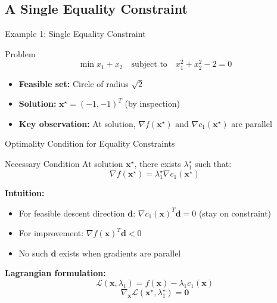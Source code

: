\documentclass[aspectratio=1610]{beamer}
\begin{document}
\subsection{A Single Equality Constraint}
\begin{frame}{Example 1: Single Equality Constraint}
  \begin{block}{Problem}
    $$\min x_1 + x_2 \quad \text{subject to} \quad x_1^2 + x_2^2 - 2 = 0$$
  \end{block}
  
  \begin{itemize}
    \item \textbf{Feasible set:} Circle of radius $\sqrt{2}$
    \item \textbf{Solution:} $\mathbf{x}^{\star} = (-1, -1)^T$ (by inspection)
    \item \textbf{Key observation:} At solution, $\nabla f(\mathbf{x}^{\star})$ and $\nabla c_1(\mathbf{x}^{\star})$ are parallel
  \end{itemize}
  
  \vspace{0.3cm}
\end{frame}

\begin{frame}{Optimality Condition for Equality Constraints}
  \begin{block}{Necessary Condition}
    At solution $\mathbf{x}^{\star}$, there exists $\lambda_1^{\star}$ such that:
    $$\nabla f(\mathbf{x}^{\star}) = \lambda_1^{\star} \nabla c_1(\mathbf{x}^{\star})$$
  \end{block}
  
  \textbf{Intuition:}
  \begin{itemize}
    \item For feasible descent direction $\mathbf{d}$: $\nabla c_1(\mathbf{x})^T \mathbf{d} = 0$ (stay on constraint)
    \item For improvement: $\nabla f(\mathbf{x})^T \mathbf{d} < 0$
    \item No such $\mathbf{d}$ exists when gradients are parallel
  \end{itemize}
  
  \vspace{0.3cm}
  \textbf{Lagrangian formulation:}
  $$\mathcal{L}(\mathbf{x}, \lambda_1) = f(\mathbf{x}) - \lambda_1 c_1(\mathbf{x})$$
  $$\nabla_{\mathbf{x}} \mathcal{L}(\mathbf{x}^{\star}, \lambda_1^{\star}) = \mathbf{0}$$
\end{frame}
\end{document}
